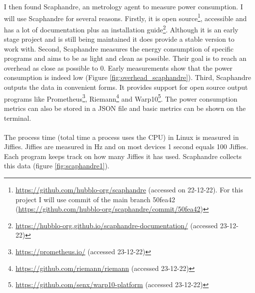 \documentclass[../thesis.tex]{subfiles}
\begin{document}
I then found Scaphandre, an metrology agent to measure power consumption. I will use Scaphandre for several reasons. Firstly, it is open source\footnote{\url{https://github.com/hubblo-org/scaphandre} (accessed on 22-12-22). For this project I will use commit of the main branch 50fea42 (\url{https://github.com/hubblo-org/scaphandre/commit/50fea42})}, accessible and has a lot of documentation plus an installation guide\footnote{\url{https://hubblo-org.github.io/scaphandre-documentation/} (accessed 23-12-22)}. Although it is an early stage project and is still being maintained it does provide a stable version to work with. Second, Scaphandre measures the energy consumption of specific programs and aims to be as light and clean as possible. Their goal is to reach an overhead as close as possible to 0. Early measurements show that the power consumption is indeed low (Figure \ref{fig:overhead_scaphandre}). Third, Scaphandre outputs the data in convenient forms. It provides support for open source output programs like Prometheus\footnote{\url{https://prometheus.io/} (accessed 23-12-22)}, Riemann\footnote{\url{https://github.com/riemann/riemann} (accessed 23-12-22)} and Warp10\footnote{\url{https://github.com/senx/warp10-platform} (accessed 23-12-22)}. The power consumption metrics can also be stored in a JSON file and basic metrics can be shown on the terminal. \paragraph{}

The process time (total time a process uses the CPU) in Linux is measured in Jiffies. Jiffies are measured in Hz and on most devices 1 second equals 100 Jiffies. Each program keeps track on how many Jiffies it has used. Scaphandre collects this data (figure \ref{fig:scaphandre1}).
\end{document}
